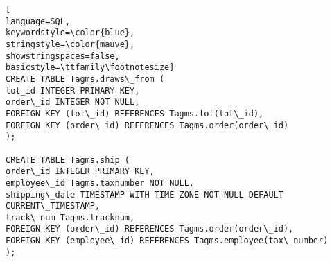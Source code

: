 \begin{lstlisting}[
language=SQL,
keywordstyle=\color{blue},
stringstyle=\color{mauve},
showstringspaces=false,
basicstyle=\ttfamily\footnotesize]
CREATE TABLE Tagms.draws\_from (
lot_id INTEGER PRIMARY KEY,
order\_id INTEGER NOT NULL,
FOREIGN KEY (lot\_id) REFERENCES Tagms.lot(lot\_id),
FOREIGN KEY (order\_id) REFERENCES Tagms.order(order\_id)
);

CREATE TABLE Tagms.ship (
order\_id INTEGER PRIMARY KEY,
employee\_id Tagms.taxnumber NOT NULL,
shipping\_date TIMESTAMP WITH TIME ZONE NOT NULL DEFAULT CURRENT\_TIMESTAMP,
track\_num Tagms.tracknum,
FOREIGN KEY (order\_id) REFERENCES Tagms.order(order\_id),
FOREIGN KEY (employee\_id) REFERENCES Tagms.employee(tax\_number)
);

\end{lstlisting}
